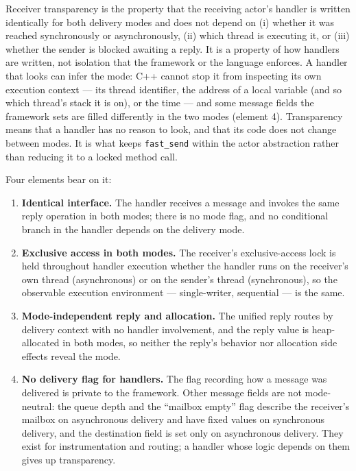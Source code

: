 \documentclass[11pt]{article}
\newcommand{\fs}{\texttt{fast\_send}}
\begin{document}
Receiver transparency is the property that the receiving actor's handler is
written identically for both delivery modes and does not depend on (i) whether it
was reached synchronously or asynchronously, (ii) which thread is executing it,
or (iii) whether the sender is blocked awaiting a reply. It is a property of how
handlers are written, not isolation that the framework or the language enforces. A
handler that looks can infer the mode: C++ cannot stop it from inspecting its own
execution context --- its thread identifier, the address of a local variable (and
so which thread's stack it is on), or the time --- and some message fields the
framework sets are filled differently in the two modes (element 4). Transparency
means that a handler has no reason to look, and that its code does not change
between modes. It is what keeps \fs{} within the actor
abstraction rather than reducing it to a locked method call.

Four elements bear on it:

\begin{enumerate}[leftmargin=1.6em]
  \item \textbf{Identical interface.} The handler receives a message and invokes
  the same reply operation in both modes; there is no mode flag, and no
  conditional branch in the handler depends on the delivery mode.
  \item \textbf{Exclusive access in both modes.} The receiver's exclusive-access
  lock is held throughout handler execution whether the handler runs on the
  receiver's own thread (asynchronous) or on the sender's thread
  (synchronous), so the observable execution environment --- single-writer,
  sequential --- is the same.
  \item \textbf{Mode-independent reply and allocation.} The unified reply routes
  by delivery context with no handler involvement, and the reply value is
  heap-allocated in both modes, so neither the reply's behavior nor allocation
  side effects reveal the mode.
  \item \textbf{No delivery flag for handlers.} The flag recording how a message
  was delivered is private to the framework. Other message fields are not
  mode-neutral: the queue depth and the ``mailbox empty'' flag describe the
  receiver's mailbox on asynchronous delivery and have fixed values on synchronous
  delivery, and the destination field is set only on asynchronous delivery. They
  exist for instrumentation and routing; a handler whose logic depends on them
  gives up transparency.
\end{enumerate}
\end{document}
